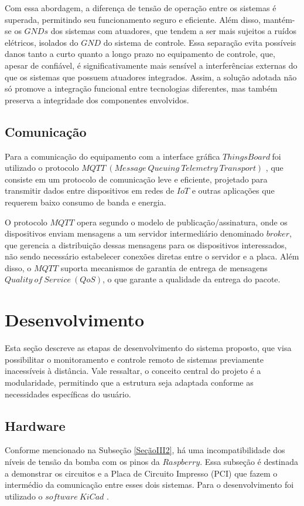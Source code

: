 \documentclass{ecatfg}
\begin{document}
Com essa abordagem, a diferença de tensão de operação entre os sistemas é superada, permitindo seu funcionamento seguro e eficiente. Além disso, mantém-se os $GNDs$ dos sistemas com atuadores, que tendem a ser mais sujeitos a ruídos elétricos, isolados do $GND$ do sistema de controle. Essa separação evita possíveis danos tanto a curto quanto a longo prazo no equipamento de controle, que, apesar de confiável, é significativamente mais sensível a interferências externas do que os sistemas que possuem atuadores integrados. Assim, a solução adotada não só promove a integração funcional entre tecnologias diferentes, mas também preserva a integridade dos componentes envolvidos. \par

\subsection{Comunicação}
Para a comunicação do equipamento com a interface gráfica $ThingsBoard\ $foi utilizado o protocolo $MQTT\ (Message\ Queuing\ Telemetry\ Transport)$ \cite{mqtt}, que consiste em um protocolo de comunicação leve e eficiente, projetado para transmitir dados entre dispositivos em redes de $IoT$ e outras aplicações que requerem baixo consumo de banda e energia.\par

O protocolo $MQTT$ opera segundo o modelo de publicação/assinatura, onde os dispositivos enviam mensagens a um servidor intermediário denominado $broker$, que gerencia a distribuição dessas mensagens para os dispositivos interessados, não sendo necessário estabelecer conexões diretas entre o servidor e a placa. Além disso, o $MQTT$ suporta mecanismos de garantia de entrega de mensagens $Quality\ of\ Service\ (QoS)$, o que garante a qualidade da entrega do pacote.\par

\section{Desenvolvimento}
Esta seção descreve as etapas de desenvolvimento do sistema proposto, que visa possibilitar o monitoramento e controle remoto de sistemas previamente inacessíveis à distância. Vale ressaltar, o conceito central do projeto é a modularidade, permitindo que a estrutura seja adaptada conforme as necessidades específicas do usuário.\par

\subsection{Hardware}
Conforme mencionado na Subseção \ref{SeçãoIII2}, há uma incompatibilidade dos níveis de tensão da bomba com os pinos da $Raspberry$. Essa subseção é destinada a demonstrar os circuitos e a Placa de Circuito Impresso (PCI) que fazem o intermédio da comunicação entre esses dois sistemas. Para o desenvolvimento foi utilizado o $software\ KiCad$ \cite{kicad}. \par
\end{document}
